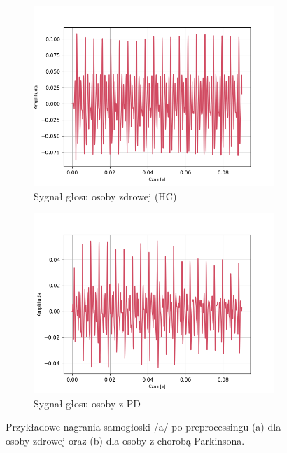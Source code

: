 \begin{figure}[ht]
    \centering
    \begin{subfigure}{0.49\textwidth}
        \centering
        \includegraphics[width=\textwidth]{./img/recordings/HC_a}
        \caption{Sygnał głosu osoby zdrowej (HC)\@}
        \label{fig:recording_HC}
    \end{subfigure}
    \begin{subfigure}{0.49\textwidth}
        \centering
        \includegraphics[width=\textwidth]{./img/recordings/PD_a}
        \caption{Sygnał głosu osoby z PD\@}
        \label{fig:recording_PD}
    \end{subfigure}

    \caption{Przykładowe nagrania samogłoski /a/ po preprocessingu (a) dla osoby zdrowej oraz (b) dla osoby z chorobą Parkinsona.}
    \label{fig:recordings}
\end{figure}

